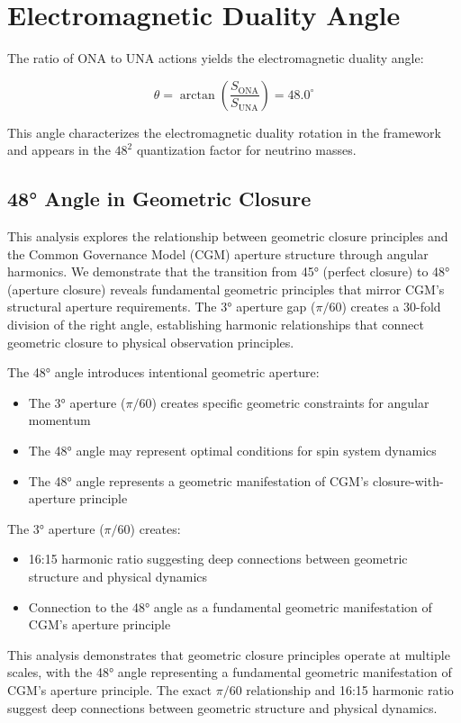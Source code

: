 \documentclass[11pt,a4paper]{article}
\theoremstyle{definition}
\theoremstyle{remark}
\begin{document}
\section{Electromagnetic Duality Angle}

The ratio of ONA to UNA actions yields the electromagnetic duality angle:

\begin{equation}
\theta = \arctan\left(\frac{S_{\mathrm{ONA}}}{S_{\mathrm{UNA}}}\right) = 48.0^\circ
\end{equation}

This angle characterizes the electromagnetic duality rotation in the framework and appears in the $48^2$ quantization factor for neutrino masses.

\subsection{48° Angle in Geometric Closure}

This analysis explores the relationship between geometric closure principles and the Common Governance Model (CGM) aperture structure through angular harmonics. We demonstrate that the transition from 45° (perfect closure) to 48° (aperture closure) reveals fundamental geometric principles that mirror CGM's structural aperture requirements. The 3° aperture gap ($\pi/60$) creates a 30-fold division of the right angle, establishing harmonic relationships that connect geometric closure to physical observation principles.

The 48° angle introduces intentional geometric aperture:
\begin{itemize}
\item The 3° aperture ($\pi/60$) creates specific geometric constraints for angular momentum
\item The 48° angle may represent optimal conditions for spin system dynamics
\item The 48° angle represents a geometric manifestation of CGM's closure-with-aperture principle
\end{itemize}

The 3° aperture ($\pi/60$) creates:
\begin{itemize}
\item 16:15 harmonic ratio suggesting deep connections between geometric structure and physical dynamics
\item Connection to the 48° angle as a fundamental geometric manifestation of CGM's aperture principle
\end{itemize}

This analysis demonstrates that geometric closure principles operate at multiple scales, with the 48° angle representing a fundamental geometric manifestation of CGM's aperture principle. The exact $\pi/60$ relationship and 16:15 harmonic ratio suggest deep connections between geometric structure and physical dynamics. 
\end{document}
